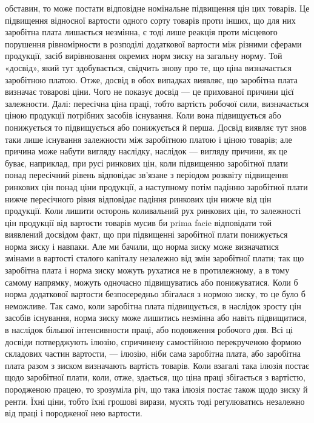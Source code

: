 обставин, то може постати відповідне номінальне підвищення цін цих товарів. Це
підвищення відносної вартости одного сорту товарів проти інших, що для них
заробітна плата лишається незмінна, є тоді лише реакція проти місцевого порушення
рівномірности в розподілі додаткової вартости між різними сферами продукції,
засіб вирівнювання окремих норм зиску на загальну норму. Той «досвід», який
тут здобувається, свідчить знову про те, що ціна визначається заробітною платою.
Отже, досвід в обох випадках виявляє, що заробітна плата визначає товарові
ціни. Чого не показує досвід — це прихованої причини цієї залежности.
Далі: пересічна ціна праці, тобто вартість робочої сили, визначається ціною
продукції потрібних засобів існування. Коли вона підвищується або понижується
то підвищується або понижується й перша. Досвід виявляє тут знов таки лише
існування залежности між заробітною платою і ціною товарів; але причина
може набути вигляду наслідку, наслідок — вигляду причини, як це буває, наприклад,
при русі ринкових цін, коли підвищенню заробітної плати понад пересічний
рівень відповідає зв’язане з періодом розквіту підвищення ринкових цін
понад ціни продукції, а наступному потім падінню заробітної плати нижче пересічного
рівня відповідає падіння ринкових цін нижче від цін продукції. Коли
лишити осторонь коливальний рух ринкових цін, то залежності цін продукції
від вартости товарів мусив би prima facie відповідати той виявлений досвідом
факт, що при підвищенні заробітної плати понижується норма зиску і навпаки.
Але ми бачили, що норма зиску може визначатися змінами в вартості сталого
капіталу незалежно від змін заробітної плати; так що заробітна плата і
норма зиску можуть рухатися не в протилежному, а в тому самому напрямку,
можуть одночасно підвищуватись або понижуватися. Коли б норма додаткової
вартости безпосередньо збігалася з нормою зиску, то це було б неможливе.
Так само, коли заробітна плата підвищується, в наслідок зросту цін засобів
існування, норма зиску може лишитись незмінна або навіть підвищитися, в наслідок
більшої інтенсивности праці, або подовження робочого дня. Всі ці досвіди
потверджують ілюзію, спричинену самостійною перекрученою формою складових
частин вартости, — ілюзію, ніби сама заробітна плата, або заробітна плата разом
з зиском визначають вартість товарів. Коли взагалі така ілюзія постає
щодо заробітної плати, коли, отже, здається, що ціна праці збігається з вартістю,
породженою працею, то зрозуміла річ, що така ілюзія постає також щодо зиску
й ренти. Їхні ціни, тобто їхні грошові вирази, мусять тоді регулюватись
незалежно від праці і породженої нею вартости.

